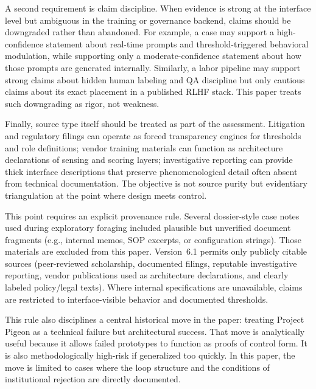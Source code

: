 \documentclass[runningheads]{llncs}
\begin{document}
A second requirement is claim discipline. When evidence is strong at the interface level but ambiguous in the training or governance backend, claims should be downgraded rather than abandoned. For example, a case may support a high-confidence statement about real-time prompts and threshold-triggered behavioral modulation, while supporting only a moderate-confidence statement about how those prompts are generated internally. Similarly, a labor pipeline may support strong claims about hidden human labeling and QA discipline but only cautious claims about its exact placement in a published RLHF stack. This paper treats such downgrading as rigor, not weakness.

Finally, source type itself should be treated as part of the assessment. Litigation and regulatory filings can operate as forced transparency engines for thresholds and role definitions; vendor training materials can function as architecture declarations of sensing and scoring layers; investigative reporting can provide thick interface descriptions that preserve phenomenological detail often absent from technical documentation. The objective is not source purity but evidentiary triangulation at the point where design meets control.

This point requires an explicit provenance rule. Several dossier-style case notes used during exploratory foraging included plausible but unverified document fragments (e.g., internal memos, SOP excerpts, or configuration strings). Those materials are excluded from this paper. Version~6.1 permits only publicly citable sources (peer-reviewed scholarship, documented filings, reputable investigative reporting, vendor publications used as architecture declarations, and clearly labeled policy/legal texts). Where internal specifications are unavailable, claims are restricted to interface-visible behavior and documented thresholds.

This rule also disciplines a central historical move in the paper: treating Project Pigeon as a technical failure but architectural success. That move is analytically useful because it allows failed prototypes to function as proofs of control form. It is also methodologically high-risk if generalized too quickly. In this paper, the move is limited to cases where the loop structure and the conditions of institutional rejection are directly documented.
\end{document}
